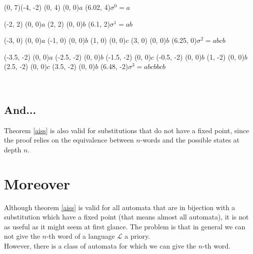 \documentclass{article}
\begin{document}
\begin{graph}(0, 7)(-4, -2)
  (0, 4) (0, 0){$a$} %
  \freetext(6.02, 4){$\sigma^0 = a$}

  (-2, 2)  (0, 0){$a$} %
  (2, 2)  (0, 0){$b$}
  \freetext(6.1, 2){$\sigma^1 = ab$}

  (-3, 0)  (0, 0){$a$} %
  (-1, 0)  (0, 0){$b$}
  (1, 0)  (0, 0){$c$}
  (3, 0)  (0, 0){$b$}
  \freetext(6.25, 0){$\sigma^2 = abcb$}

  (-3.5, -2)  (0, 0){$a$} %
  (-2.5, -2)  (0, 0){$b$}
  (-1.5, -2) (0, 0){$c$}
  (-0.5, -2)  (0, 0){$b$}
  (1, -2)  (0, 0){$b$}
  (2.5, -2)  (0, 0){$c$}
  (3.5, -2)  (0, 0){$b$}
  \freetext(6.48, -2){$\sigma^3 = abcbbcb$}

   
   
  
   
   
   
   

   
   
   
   
   
   
   
\end{graph}\\

\subsection{And...}
Theorem \ref{aiss} is also valid for substitutions that do not have a fixed
point, since the proof relies on the equivalence between $n$-words and the
possible states at depth $n$.

\section{Moreover}
Although theorem \ref{aiss} is valid for all automata that are in bijection 
with a substitution which have a fixed point (that means almost all automata), 
it is not as useful as it might seem at first glance. The problem is that in
general we can not give the $n$-th word of a language $\mathcal{L}$ a priory.\\
However, there is a class of automata for which we can give the $n$-th word.
\end{document}
